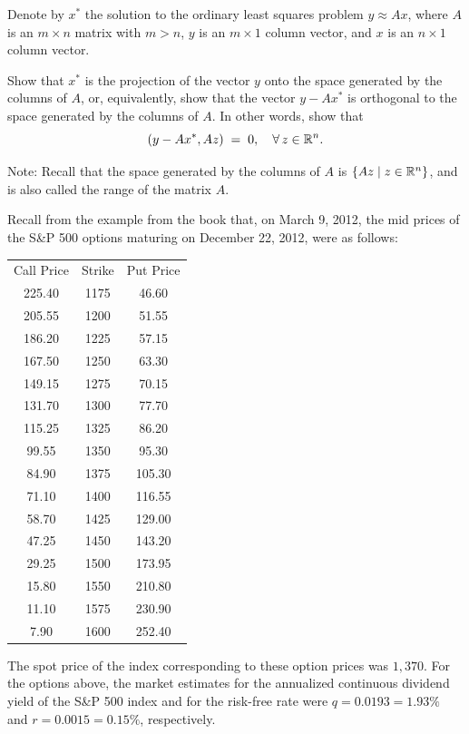 \begin{exercises}

\item Denote by $x^*$ the solution to the ordinary least squares problem $y\approx Ax$,
where $A$ is an $m\times n$ matrix with $m>n$, $y$ is an $m\times1$ column vector, and
$x$ is an $n\times1$ column vector.

Show that $x^*$ is the projection of the vector $y$ onto the space generated by the
columns of $A$, or, equivalently, show that the vector $y-Ax^*$ is orthogonal to the
space generated by the columns of $A$. In other words, show that
\[
(y-Ax^*, Az) \;=\; 0, \quad \forall\, z\in\mathbb{R}^n.
\]

Note: Recall that the space generated by the columns of $A$ is $\{Az \mid z\in\mathbb{R}^n\}$,
and is also called the range of the matrix $A$.

\item Recall from the example from the book that, on March 9, 2012, the mid prices of
the S\&P 500 options maturing on December 22, 2012, were as follows:
\begin{center}
\begin{tabular}{ccc}
Call Price & Strike & Put Price \\[0.4em]
225.40 & 1175 & 46.60 \\
205.55 & 1200 & 51.55 \\
186.20 & 1225 & 57.15 \\
167.50 & 1250 & 63.30 \\
149.15 & 1275 & 70.15 \\
131.70 & 1300 & 77.70 \\
115.25 & 1325 & 86.20 \\
99.55 & 1350 & 95.30 \\
84.90 & 1375 & 105.30 \\
71.10 & 1400 & 116.55 \\
58.70 & 1425 & 129.00 \\
47.25 & 1450 & 143.20 \\
29.25 & 1500 & 173.95 \\
15.80 & 1550 & 210.80 \\
11.10 & 1575 & 230.90 \\
7.90 & 1600 & 252.40
\end{tabular}
\end{center}

The spot price of the index corresponding to these option prices was $1,370$. For the
options above, the market estimates for the annualized continuous dividend yield of the
S\&P 500 index and for the risk-free rate were $q=0.0193=1.93\%$ and $r=0.0015=0.15\%$,
respectively.


\end{exercises}
